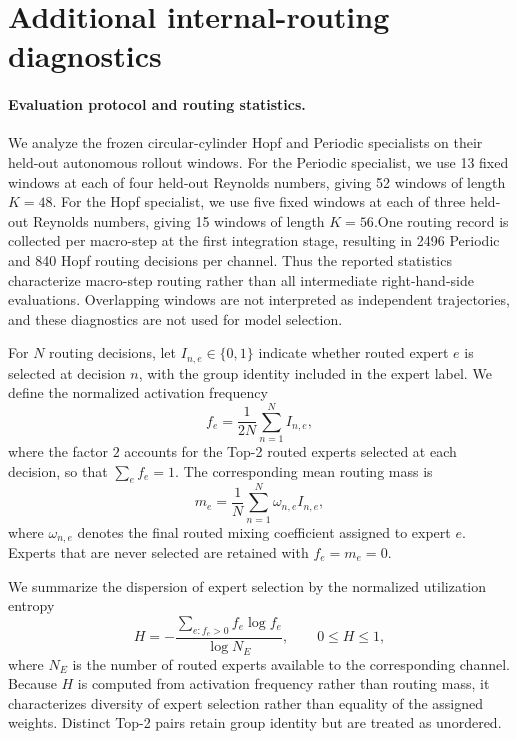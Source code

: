 \section{Additional internal-routing diagnostics}
\label{app:internal_routing}

\paragraph{Evaluation protocol and routing statistics.}
We analyze the frozen circular-cylinder Hopf and Periodic specialists on their held-out autonomous rollout windows.
For the Periodic specialist, we use 13 fixed windows at each of four held-out Reynolds numbers, giving 52 windows of length $K=48$. For the Hopf specialist, we use five fixed windows at each of three held-out Reynolds numbers, giving 15 windows of length $K=56$.One routing record is collected per macro-step at the first integration stage, resulting in 2496 Periodic and 840 Hopf routing decisions per channel. Thus the reported statistics characterize macro-step routing rather than all intermediate right-hand-side evaluations. Overlapping windows are not interpreted as independent trajectories, and these diagnostics are not used for model selection.

For $N$ routing decisions, let $I_{n,e}\in\{0,1\}$ indicate whether routed expert $e$ is selected at decision $n$, with the group identity included in the expert label. We define the normalized activation frequency
\begin{equation}
  f_e
  =
  \frac{1}{2N}
  \sum_{n=1}^{N} I_{n,e},
  \label{eq:app_routing_frequency}
\end{equation}
where the factor $2$ accounts for the Top-2 routed experts selected at each decision, so that $\sum_e f_e=1$. The corresponding mean routing mass is
\begin{equation}
  m_e
  =
  \frac{1}{N}
  \sum_{n=1}^{N}
  \omega_{n,e}I_{n,e},
  \label{eq:app_routing_mass}
\end{equation}
where $\omega_{n,e}$ denotes the final routed mixing coefficient assigned to expert $e$. Experts that are never selected are retained with $f_e=m_e=0$.

We summarize the dispersion of expert selection by the normalized utilization entropy
\begin{equation}
  H
  =
  -\frac{
    \sum_{e:f_e>0} f_e\log f_e
  }{
    \log N_E
  },
  \qquad
  0\le H\le1,
  \label{eq:app_routing_entropy}
\end{equation}
where $N_E$ is the number of routed experts available to the corresponding channel. Because $H$ is computed from activation frequency rather than routing mass, it characterizes diversity of expert selection rather than equality of the assigned weights. Distinct Top-2 pairs retain group identity but are treated as unordered.

